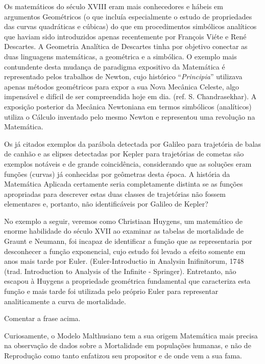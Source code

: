     Os matemáticos do século XVIII eram mais conhecedores e hábeis em argumentos Geométricos (o que incluía especialmente o estudo de propriedades das curvas quadráticas e cúbicas) do que em procedimentos simbólicos analíticos que haviam sido introduzidos apenas recentemente por François Viéte e René Descartes. A Geometria Analítica de Descartes tinha por objetivo conectar as duas linguagens matemáticas, a geométrica e a simbólica. O exemplo mais contundente desta mudança de paradigma expositivo da Matemática é representado pelos trabalhos de Newton, cujo histórico ``\textit{Principia}'' utilizava apenas métodos geométricos para expor a sua Nova Mecânica Celeste, algo impensável e difícil de ser compreendida hoje em dia. (ref. S. Chandrasekhar). A exposição posterior da Mecânica Newtoniana em termos simbólicos (analíticos) utiliza o Cálculo inventado pelo mesmo Newton e representou uma revolução na Matemática.

    Os já citados exemplos da parábola detectada por Galileo para trajetória de balas de canhão e as elipses detectadas por Kepler para trajetórias de cometas são exemplos notáveis e de grande coincidência, considerando que as soluções eram funções (curvas) já conhecidas por geômetras desta época. A história da Matemática Aplicada certamente seria completamente distinta se as funções apropriadas para descrever estas duas classes de trajetórias não fossem elementares e, portanto, não identificáveis por Galileo de Kepler?

    No exemplo a seguir, veremos como Christiaan Huygens, um matemático de enorme habilidade do século XVII ao examinar as tabelas de mortalidade de Graunt e Neumann, foi incapaz de identificar a função que as representaria por desconhecer a função exponencial, cujo estudo foi levado a efeito somente em anos mais tarde por Euler. (Euler-Introductio in Analysin Inifinitorum, 1748 (trad. Introduction to Analysis of the Infinite - Springer). Entretanto, não escapou à Huygens a propriedade geométrica fundamental que caracteriza esta função e mais tarde foi utilizada pelo próprio Euler para representar analiticamente a curva de mortalidade.

\begin{exercise}
Comentar a frase acima.
\end{exercise}

    Curiosamente, o Modelo Malthusiano tem a sua origem Matemática mais precisa na observação de dados sobre a Mortalidade em populações humanas, e não de Reprodução como tanto enfatizou seu propositor e de onde vem a sua fama.

